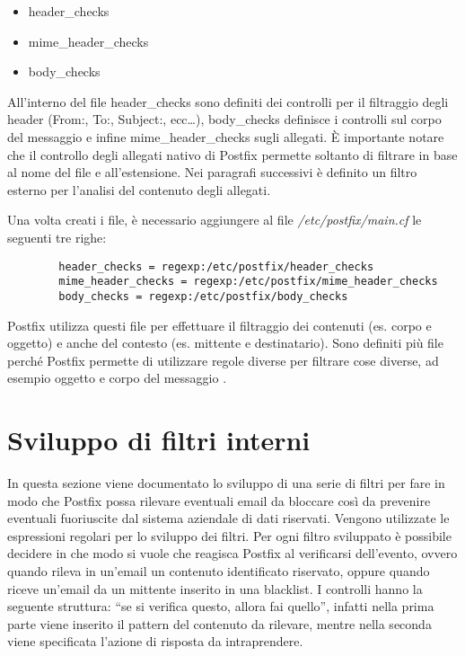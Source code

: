     \begin{itemize}
        \item header\_checks
        \item mime\_header\_checks
        \item body\_checks
    \end{itemize}

    All'interno del file header\_checks sono definiti dei controlli per il filtraggio degli header
    (From:, To:, Subject:, ecc\dots), body\_checks definisce i controlli sul corpo del messaggio e
    infine mime\_header\_checks sugli allegati. È importante notare che il controllo degli allegati
    nativo di Postfix permette soltanto di filtrare in base al nome del file e all'estensione. 
    Nei paragrafi successivi è definito un filtro esterno per l'analisi del contenuto degli allegati.

    Una volta creati i file, è necessario aggiungere al file \textit{/etc/postfix/main.cf} le seguenti tre righe:

    \begin{verbatim}
        header_checks = regexp:/etc/postfix/header_checks
        mime_header_checks = regexp:/etc/postfix/mime_header_checks
        body_checks = regexp:/etc/postfix/body_checks
    \end{verbatim}

    Postfix utilizza questi file per effettuare il filtraggio dei contenuti (es. corpo e oggetto) e anche del
    contesto (es. mittente e destinatario). Sono definiti più file perché Postfix permette di utilizzare regole 
    diverse per filtrare cose diverse, ad esempio oggetto e corpo del messaggio \cite{hildebrandt2005book}.

    \section{Sviluppo di filtri interni}
    In questa sezione viene documentato lo sviluppo di una serie di filtri per fare in modo che Postfix possa 
    rilevare eventuali email da bloccare così da prevenire eventuali fuoriuscite dal sistema aziendale di dati riservati. 
    Vengono utilizzate le espressioni regolari per lo sviluppo dei filtri. Per ogni filtro sviluppato è possibile 
    decidere in che modo si vuole che reagisca Postfix al verificarsi dell’evento, 
    ovvero quando rileva in un’email un contenuto identificato riservato, oppure quando riceve un’email da un 
    mittente inserito in una blacklist.
    I controlli hanno la seguente struttura: “se si verifica questo, allora fai quello”, 
    infatti nella prima parte viene inserito il pattern del contenuto da rilevare, mentre nella seconda viene 
    specificata l’azione di risposta da intraprendere.

